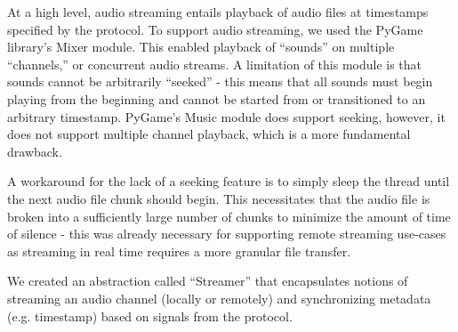\documentclass[%
               nonacm,sigconf,10pt]{acmart}
\begin{document}
At a high level, audio streaming entails playback of audio files at timestamps specified by the protocol. To support audio streaming, we used the PyGame library's Mixer module. This enabled playback of ``sounds'' on multiple ``channels,'' or concurrent audio streams. A limitation of this module is that sounds cannot be arbitrarily ``seeked'' - this means that all sounds must begin playing from the beginning and cannot be started from or transitioned to an arbitrary timestamp. PyGame's Music module does support seeking, however, it does not support multiple channel playback, which is a more fundamental drawback.

A workaround for the lack of a seeking feature is to simply sleep the thread until the next audio file chunk should begin. This necessitates that the audio file is broken into a sufficiently large number of chunks to minimize the amount of time of silence - this was already necessary for supporting remote streaming use-cases as streaming in real time requires a more granular file transfer.

We created an abstraction called ``Streamer'' that encapsulates notions of streaming an audio channel (locally or remotely) and synchronizing metadata (e.g. timestamp) based on signals from the protocol.
\end{document}
